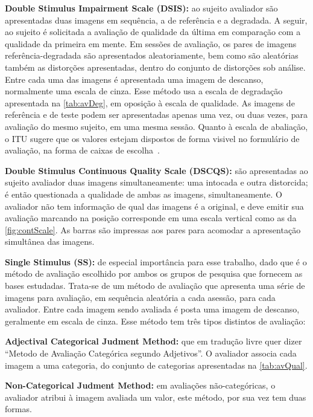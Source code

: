 \begin{description}
	\item{\textbf{Double Stimulus Impairment Scale (DSIS):}} ao sujeito avaliador são apresentadas duas imagens em sequência, a de referência e a degradada. A seguir, ao sujeito é solicitada a avaliação de qualidade da última em comparação com a qualidade da primeira em mente. Em sessões de avaliação, os pares de imagens referência-degradada são apresentados aleatoriamente, bem como são aleatórias também as distorções apresentadas, dentro do conjunto de distorções sob análise. Entre cada uma das imagens é apresentada uma imagem de descanso, normalmente uma escala de cinza. Esse método usa a escala de degradação apresentada na \autoref{tab:avDeg}, em oposição à escala de qualidade. As imagens de referência e de teste podem ser apresentadas apenas uma vez, ou duas vezes, para avaliação do mesmo sujeito, em uma mesma sessão. Quanto à escala de abaliação, o ITU sugere que os valores estejam dispostos de forma visivel no formulário de avaliação, na forma de caixas de escolha~\cite[p.12]{itur2012}.

	\item{\textbf{Double Stimulus Continuous Quality Scale (DSCQS):}} são apresentadas ao sujeito avaliador duas imagens simultaneamente: uma intocada e outra distorcida; é então questionada a qualidade de ambas as imagens, simultaneamente. O avaliador não tem informação de qual das imagens é a original, e deve emitir sua avaliação marcando na posição corresponde em uma escala vertical como as da \autoref{fig:contScale}. As barras são impressas aos pares para acomodar a apresentação simultânea das imagens.
	\item{\textbf{Single Stimulus (SS):}} de especial importância para esse trabalho, dado que é o método de avaliação escolhido por ambos os grupos de pesquisa que fornecem as bases estudadas. Trata-se de um método de avaliação que apresenta uma série de imagens para avaliação, em sequência aleatória a cada asessão, para cada avaliador. Entre cada imagem sendo avaliada é posta uma imagem de descanso, geralmente em escala de cinza. Esse método tem três tipos distintos de avaliação:
		\begin{description} 
			\item{\textbf{Adjectival Categorical Judment Method:}} que em tradução livre quer dizer ``Metodo de Avaliação Categórica segundo Adjetivos''. O avaliador associa cada imagem a uma categoria, do conjunto de categorias apresentadas na \autoref{tab:avQual}.
			\item{\textbf{Non-Categorical Judment Method:}} em avaliações não-categóricas, o avaliador atribui à imagem avaliada um valor, este método, por sua vez tem duas formas.


\end{description}
\end{description}
